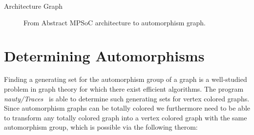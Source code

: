 \begin{exmp}[label=exmp:arch_graph]{Architecture Graph}
\begin{figure}[H]
\begin{subfigure}{.3\textwidth}
      \caption{}
      \label{fig:tcol_simple_arch_graph}
    \end{subfigure}
    \caption{From Abstract MPSoC architecture to automorphism graph.}
  \end{figure}
\end{exmp}

\section{Determining Automorphisms}
\label{sec:ag_determining_automorphisms}

Finding a generating set for the automorphism group of a graph is a
well-studied problem in graph theory for which there exist efficient
algorithms. The program \textit{nauty/Traces}~\cite{nauty} is able to determine
such generating sets for vertex colored graphs. Since automorphism graphs can
be totally colored we furthermore need to be able to transform any
totally colored graph into a vertex colored graph with the same automorphism
group, which is possible via the following therom:

